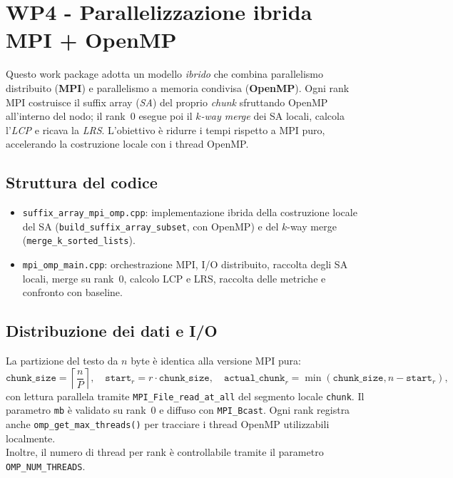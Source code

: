 \chapter{WP4 - Parallelizzazione ibrida MPI + OpenMP}
	
	Questo work package adotta un modello \textit{ibrido} che combina parallelismo distribuito (\textbf{MPI}) e parallelismo a memoria condivisa (\textbf{OpenMP}).
	Ogni rank MPI costruisce il suffix array (\emph{SA}) del proprio \emph{chunk} sfruttando OpenMP all'interno del nodo; il rank~0 esegue poi il \emph{$k$-way merge} dei SA locali, calcola l'\emph{LCP} e ricava la \emph{LRS}.
	L'obiettivo è ridurre i tempi rispetto a MPI puro, accelerando la costruzione locale con i thread OpenMP\@.
	
	\section{Struttura del codice}
		\begin{itemize}
			\item \texttt{suffix\_array\_mpi\_omp.cpp}: implementazione ibrida della costruzione locale del SA (\texttt{build\_suffix\_array\_subset}, con OpenMP) e del $k$-way merge (\texttt{merge\_k\_sorted\_lists}).
			\item \texttt{mpi\_omp\_main.cpp}: orchestrazione MPI, I/O distribuito, raccolta degli SA locali, merge su rank~0, calcolo LCP e LRS, raccolta delle metriche e confronto con baseline.
		\end{itemize}
	
	\section{Distribuzione dei dati e I/O}
		La partizione del testo da $n$ byte è identica alla versione MPI pura:
		\[
			\texttt{chunk\_size} = \left\lceil \frac{n}{P} \right\rceil,\quad
			\texttt{start}_r = r \cdot \texttt{chunk\_size},\quad
			\texttt{actual\_chunk}_r = \min(\texttt{chunk\_size}, n - \texttt{start}_r),
		\]
		con lettura parallela tramite \texttt{MPI\_File\_read\_at\_all} del segmento locale \texttt{chunk}.
		Il parametro \texttt{mb} è validato su rank~0 e diffuso con \texttt{MPI\_Bcast}.
		Ogni rank registra anche \texttt{omp\_get\_max\_threads()} per tracciare i thread OpenMP utilizzabili localmente. \\
		Inoltre, il numero di thread per rank è controllabile tramite il parametro \texttt{OMP\_NUM\_THREADS}.
	

